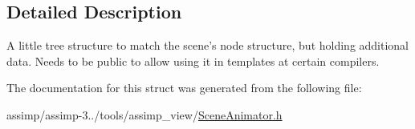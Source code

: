 \subsection{Detailed Description}
A little tree structure to match the scene's node structure, but holding additional data. Needs to be public to allow using it in templates at certain compilers. 

The documentation for this struct was generated from the following file\+:\begin{DoxyCompactItemize}
\item 
assimp/assimp-\/3../tools/assimp\+\_\+view/\hyperlink{_scene_animator_8h}{Scene\+Animator.\+h}\end{DoxyCompactItemize}
